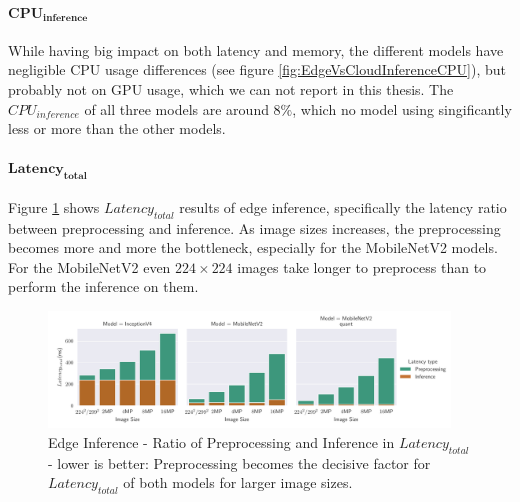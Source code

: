 \paragraph{$\mathbf{CPU_{inference}}$}
While having big impact on both latency and memory, the different models have 
negligible CPU usage differences (see figure \ref{fig:EdgeVsCloudInferenceCPU}), but probably not on GPU usage, which we can not report in this thesis.
The $CPU_{inference}$ of all three models are around $8\%$, which no model using singificantly less or more than the other models.




\paragraph{$\mathbf{Latency_{total}}$}
Figure \ref{fig:EdgeInferenceRatio} shows $Latency_{total}$ results of edge inference, specifically the latency ratio between preprocessing and inference.
As image sizes increases, the preprocessing becomes more and more the bottleneck, especially for the MobileNetV2 models.
For the MobileNetV2 even $224\times224$ images take longer to preprocess than to perform the inference on them.
\begin{figure}[!htb]
\centering
\includegraphics[width=0.95\textwidth]{./Bilder/single_plots/edge_inference_plots/Edge_Preprocessing_+_Inference.pdf}
\caption[Edge Inference - Ratio of Preprocessing and Inference in $Latency_{total}$]{Edge Inference - Ratio of Preprocessing and Inference in $Latency_{total}$ - lower is better: Preprocessing becomes the decisive factor for $Latency_{total}$ of both models for larger image sizes.}
\label{fig:EdgeInferenceRatio}
\end{figure}


